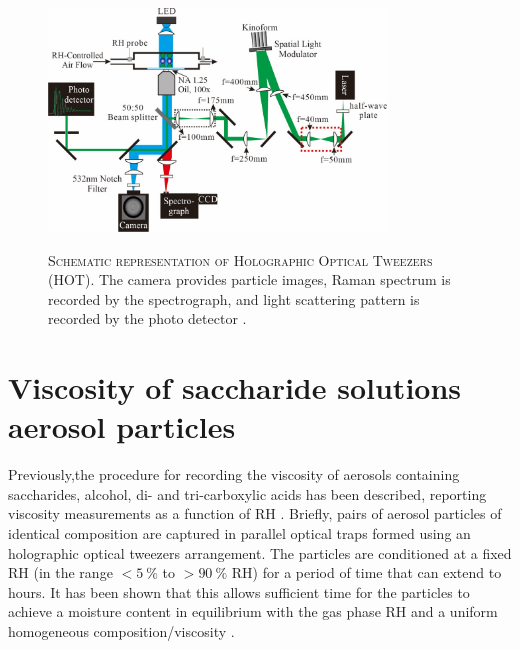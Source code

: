 \begin{figure}
    \centering
    \caption[Schematic representation of holographic optical tweezers (HOT)]{\textsc{Schematic representation of Holographic Optical Tweezers (HOT)}. The camera provides particle images, Raman spectrum is recorded by the spectrograph, and light scattering pattern is recorded by the photo detector \cite{Song2016a}.}
    \includegraphics[width=0.8\textwidth]{chapters/water_hopping/figures/image011.jpg}
    \label{fig:wat_s5}
\end{figure}

\section{Viscosity of saccharide solutions aerosol particles}

Previously,the procedure for recording the viscosity of aerosols containing saccharides, alcohol, di- and tri-carboxylic acids  has been described, reporting viscosity measurements as a function of RH \cite{powerProbingMicrorheologicalProperties2014,Song2016a,powerTransitionLiquidSolidlike2013}. Briefly, pairs of aerosol particles of identical composition are captured in parallel optical traps formed using an holographic optical tweezers arrangement. The particles are conditioned at a fixed RH (in the range $<\SI{5}{\percent}$ to $>\SI{90}{\percent}$ RH) for a period of time that can extend to hours. It has been shown that this allows sufficient time for the particles to achieve a moisture content in equilibrium with the gas phase RH and a uniform homogeneous composition/viscosity \cite{Song2016a}. 

